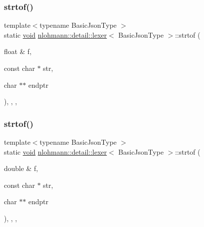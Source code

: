 \subsubsection{\texorpdfstring{strtof()}{strtof()}\hspace{0.1cm}{\footnotesize\ttfamily [1/3]}}
{\footnotesize\ttfamily template$<$typename Basic\+Json\+Type $>$ \\
static \hyperlink{namespacenlohmann_1_1detail_a59fca69799f6b9e366710cb9043aa77d}{void} \hyperlink{classnlohmann_1_1detail_1_1lexer}{nlohmann\+::detail\+::lexer}$<$ Basic\+Json\+Type $>$\+::strtof (\begin{DoxyParamCaption}\item[{float \&}]{f,  }\item[{const char $\ast$}]{str,  }\item[{char $\ast$$\ast$}]{endptr }\end{DoxyParamCaption})\hspace{0.3cm}{\ttfamily [inline]}, {\ttfamily [static]}, {\ttfamily [private]}, {\ttfamily [noexcept]}}

\mbox{\label{classnlohmann_1_1detail_1_1lexer_a8cd877d10b31bc819e4f030292737ea6}} 
\subsubsection{\texorpdfstring{strtof()}{strtof()}\hspace{0.1cm}{\footnotesize\ttfamily [2/3]}}
{\footnotesize\ttfamily template$<$typename Basic\+Json\+Type $>$ \\
static \hyperlink{namespacenlohmann_1_1detail_a59fca69799f6b9e366710cb9043aa77d}{void} \hyperlink{classnlohmann_1_1detail_1_1lexer}{nlohmann\+::detail\+::lexer}$<$ Basic\+Json\+Type $>$\+::strtof (\begin{DoxyParamCaption}\item[{double \&}]{f,  }\item[{const char $\ast$}]{str,  }\item[{char $\ast$$\ast$}]{endptr }\end{DoxyParamCaption})\hspace{0.3cm}{\ttfamily [inline]}, {\ttfamily [static]}, {\ttfamily [private]}, {\ttfamily [noexcept]}}

\mbox{\label{classnlohmann_1_1detail_1_1lexer_a0e28dda9a1e007d55d03e8d39dd3b9fa}} 
